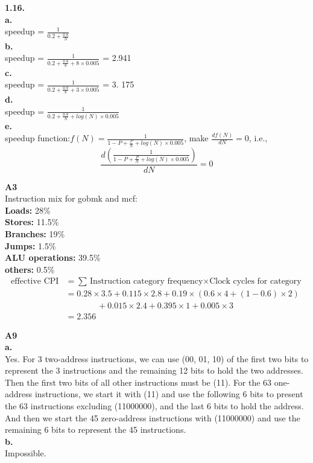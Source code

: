 \documentclass{article}
\begin{document}
\noindent \textbf{1.16.}\\
\indent \textbf{a.}\\
\indent speedup = $\frac{1}{0.2+\frac{0.8}{N}}$\\
\indent \textbf{b.}\\
\indent speedup = $\frac{1}{0.2+\frac{0.8}{8}+8\times0.005}$ = 2.941\\
\indent \textbf{c.}\\
\indent speedup = $\frac{1}{0.2+\frac{0.8}{8}+3\times0.005}$ = 3.
175\\
\indent \textbf{d.}\\
\indent speedup = $\frac{1}{0.2+\frac{0.8}{N}+log(N)\times0.005}$\\
\indent \textbf{e.}\\
speedup function:$f(N) = \frac{1}{1-P+\frac{P}{N}+log(N)\times0.005}$, make $\frac{df(N)}{dN}=0$, i.e.,
\begin{equation*}
    \frac{d\left(\frac{1}{1-P+\frac{P}{N}+log(N)\times0.005}\right)}{dN}=0
\end{equation*}

\noindent\textbf{A3}\\
Instruction mix for gobmk and mcf:\\
\textbf{Loads:} 28\%\\
\textbf{Stores:} 11.5\%\\
\textbf{Branches:} 19\%\\
\textbf{Jumps:} 1.5\%\\
\textbf{ALU operations:} 39.5\%\\
\textbf{others:} 0.5\%\\
\begin{align*}
    \text{effective CPI}&=\sum{\text{Instruction category frequency}\times\text{Clock cycles for category}}\\
    &=0.28\times 3.5+0.115\times 2.8+0.19\times (0.6\times 4+(1-0.6)\times 2)\\
    &\ \ \ \ \ \ \ \ \ \ \ \ \ \ \ \ \ +0.015\times 2.4+0.395\times 1 + 0.005\times 3\\
    &=2.356
\end{align*}

\noindent\textbf{A9}\\
\indent \textbf{a.}\\
\indent Yes. For 3 two-address instructions, we can use (00, 01, 10) of the first two bits to represent the 3 instructions and the remaining 12 bits to hold the two addresses. Then the first two bits of all other instructions must be (11). For the 63 one-address instructions, we start it with (11) and use the following 6 bits to present the 63 instructions excluding (11000000), and the last 6 bits to hold the address. And then we start the 45 zero-address instructions with (11000000) and use the remaining 6 bits to represent the 45 instructions.\\
\indent \textbf{b.}\\
\indent Impossible.
\end{document}
